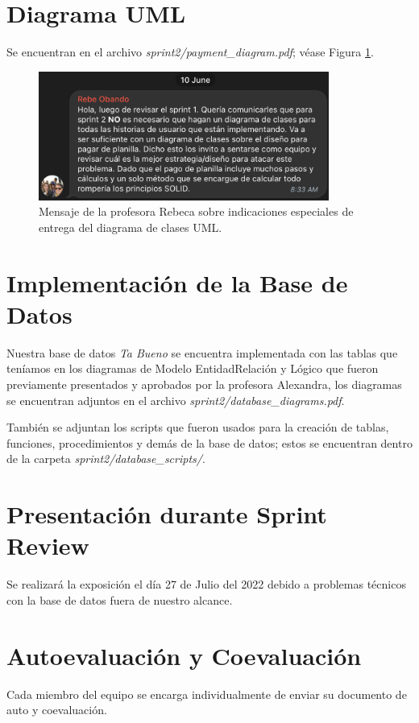 \documentclass{article}
\begin{document}
\section{Diagrama UML}
Se encuentran en el archivo \textit{sprint2/payment\_diagram.pdf}; véase Figura \ref{fig:message2}.

\begin{figure}[h]
  \centering
  \includegraphics[width=0.85\textwidth]{message2.png}
  \caption{Mensaje de la profesora Rebeca sobre indicaciones especiales de entrega del diagrama de clases UML.}
  \label{fig:message2}
 \end{figure}

 \section{Implementación de la Base de Datos}
Nuestra base de datos \textit{Ta Bueno} se encuentra implementada con las tablas que teníamos
en los diagramas de Modelo Entidad\-Relación y Lógico que fueron previamente presentados y aprobados por la profesora 
Alexandra, los diagramas se encuentran adjuntos en el archivo \textit{sprint2/database\_diagrams.pdf}.

También se adjuntan los scripts que fueron usados para la creación de tablas, funciones, procedimientos 
y demás de la base de datos; estos se encuentran dentro de la carpeta \textit{sprint2/database\_scripts/}.

\section{Presentación durante Sprint Review}
Se realizará la exposición el día 27 de Julio del 2022 debido a problemas técnicos con la 
base de datos fuera de nuestro alcance.

\section{Autoevaluación y Coevaluación}
Cada miembro del equipo se encarga individualmente de enviar su documento de auto y coevaluación.


\newpage


\end{document}
